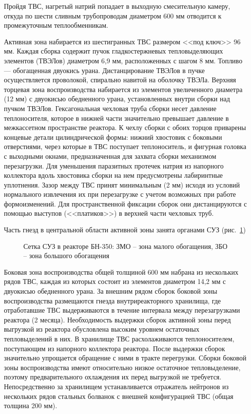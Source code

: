 Пройдя ТВС, нагретый натрий попадает в выходную смесительную камеру, откуда по шести сливным трубопроводам диаметром 600 мм отводится к промежуточным теплообменникам.

Активная зона набирается из шестигранных ТВС размером <<под ключ>> 96 мм. 
Каждая сборка содержит пучок гладкостержневых тепловыделяющих элементов (ТВЭЛов) диаметром 6,9 мм, расположенных с шагом 8 мм.
Топливо --- обогащенная двуокись урана.
Дистанцирование ТВЭЛов в пучке осуществляется проволокой, спирально навитой на оболочку ТВЭЛа.
Верхняя торцевая зона воспроизводства набирается из элементов увеличенного диаметра (12 мм) с двуокисью обедненного урана, установленных внутри сборки над пучком ТВЭЛов.
Гексагональная чехловая труба сборки несет давление теплоносителя, которое в нижней части значительно превышает давление в межкассетном пространстве реактора.
К чехлу сборки с обоих торцов приварены концевые детали цилиндрической формы: нижний хвостовик с боковыми отверстиями, через которые в ТВС поступает теплоноситель, и фигурная головка с выходными  окнами, предназначенная для захвата сборки механизмом перезагрузки.
Для уменьшения паразитных протечек натрия из напорного коллектора вдоль хвостовика сборки на нем предусмотрены лабиринтные уплотнения.
Зазор между ТВС принят минимальным (2 мм) исходя из условий нормального извлечения их при перезагрузке с учетом возможных при работе формоизменений.
Для пространственной фиксации сборок они дистанцируются с помощью выступов (<<платиков>>) в верхней части чехловых труб.

Часть гнезд в центральной области активной зоны занята органами СУЗ (рис.~\ref{pic:basic-grid})
\begin{figure}[ht]
\caption[Сетка СУЗ в реакторе БН-350]{Сетка СУЗ в реакторе БН-350: ЗМО -- зона малого обогащения, ЗБО -- зона большого обогащения}
\label{pic:basic-grid}
\end{figure}
Боковая зона воспроизводства общей толщиной 600 мм набрана из нескольких рядов ТВС, каждая из которых состоит из элементов диаметром 14,2 мм с двуокисью обедненного урана.
За внешним рядом сборок боковой зоны воспроизводства размещаются гнезда внутриреакторного хранилища, где отработавшие ТВС выдерживаются в течение интервала между перезагрузками реактора (2 месяца).
Необходимость выдержки сборок активной зоны перед выгрузкой из реактора обусловлена высоким уровнем остаточных тепловыделений в них.
В хранилище ТВС расхолаживаются теплоносителем, поступающим из напорного коллектора реактора.
После выдержки сборок значительно упрощается обращение с ними в тракте перегрузки.
Сборки боковой зоны воспроизводства имеют относительно низкое остаточное тепловыделение, поэтому предварительного охлаждения их перед выгрузкой не требуется.
Непосредственно за хранилищем устанавливается отражатель нейтронов из нескольких рядов стальных болванок с внешней конфигурацией ТВС (общая толщина 200 мм).

